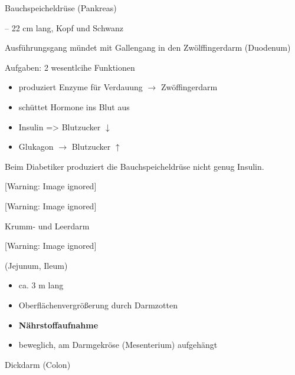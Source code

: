 \documentclass{article}
\newcommand\gEs[1]{\textbf{\textcolor[rgb]{0.0,0.0,0.5019608}{#1}}}
\newcommand\gEs[1]{\textbf{\textcolor[rgb]{0.0,0.0,0.5019608}{#1}}}
\newcommand\gZ[1]{\textcolor[rgb]{0.5019608,0.5019608,0.5019608}{#1}}
\begin{document}
{\mdseries\color[rgb]{0.0,0.0,0.5019608}
Bauchspeicheldr\"use
(Pankreas)}

{ -- 22 cm lang, Kopf und Schwanz}

{\mdseries
Ausf\"uhrungsgang m\"undet mit Gallengang in den Zw\"olffingerdarm
(Duodenum)}

{\mdseries
Aufgaben: 2 wesentlcihe Funktionen}

\begin{itemize}
\item produziert Enzyme f\"ur Verdauung ${\rightarrow}$ Zw\"offingerdarm

\item sch\"uttet Hormone ins Blut aus

\item {}Insulin ={\textgreater} Blutzucker ${\downarrow}$

\item Glukagon ${\rightarrow}$ Blutzucker ${\uparrow}$

\end{itemize}
Beim Diabetiker produziert die Bauchspeicheldr\"use nicht genug Insulin.




\begin{center}
 [Warning: Image ignored] %

\end{center}
\begin{center}
 [Warning: Image ignored] %

\end{center}
{\mdseries\color[rgb]{0.0,0.0,0.5019608}
Krumm- und Leerdarm }

\begin{center}
 [Warning: Image ignored] %

\end{center}
{\mdseries
\gZ{(Jejunum, Ileum)}}

\begin{itemize}
\item {\mdseries
ca. 3 m lang}

\item {\mdseries
Oberfl\"achenvergr\"o{\ss}erung durch Darmzotten}

\item {\mdseries
\gEs{N\"ahrstoffaufnahme}}

\item {\mdseries
beweglich, am Darmgekr\"ose (Mesenterium) aufgeh\"angt}

\end{itemize}
{\mdseries\color[rgb]{0.0,0.0,0.5019608}
Dickdarm (Colon)}
\end{document}

